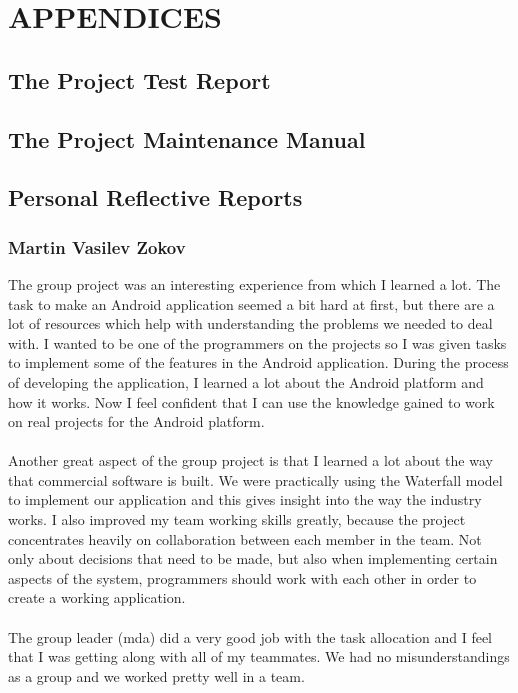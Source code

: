 \documentclass[12pt, portrait]{article}
\begin{document}
\section{APPENDICES}
\subsection{The Project Test Report}
\newpage
\subsection{The Project Maintenance Manual}
\newpage
\subsection{Personal Reflective Reports}
\subsubsection{Martin Vasilev Zokov}
The group project was an interesting experience from which I learned a lot. The task to make an Android application seemed a bit hard at first, but there are a lot of resources which help with understanding the problems we needed to deal with. I wanted to be one of the programmers on the projects so I was given tasks to implement some of the features in the Android application. During the process of developing the application, I learned a lot about the Android platform and how it works. Now I feel confident that I can use the knowledge gained to work on real projects for the Android platform.
~\\\\ 
Another great aspect of the group project is that I learned a lot about the way that commercial software is built. We were practically using the Waterfall model to implement our application and this gives insight into the way the industry works. I also improved my team working skills greatly, because the project concentrates heavily on collaboration between each member in the team. Not only about decisions that need to be made, but also when implementing certain aspects of the system, programmers should work with each other in order to create a working application.
~\\\\ 
The group leader (mda) did a very good job with the task allocation and I feel that I was getting along with all of my teammates. We had no misunderstandings as a group and we worked pretty well in a team.
\end{document}
